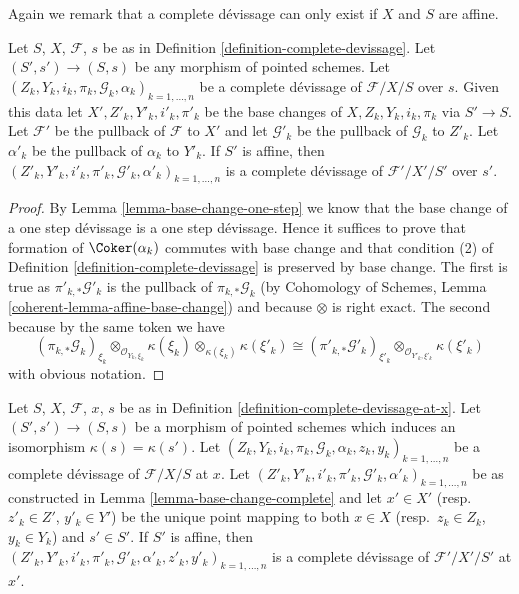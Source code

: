 \noindent
Again we remark that a complete d\'evissage can only exist if $X$ and
$S$ are affine.

\begin{lemma}
\label{lemma-base-change-complete}
Let $S$, $X$, $\mathcal{F}$, $s$ be as in
Definition \ref{definition-complete-devissage}.
Let $(S', s') \to (S, s)$ be any morphism of pointed schemes.
Let $(Z_k, Y_k, i_k, \pi_k, \mathcal{G}_k, \alpha_k)_{k = 1, \ldots, n}$
be a complete d\'evissage of $\mathcal{F}/X/S$ over $s$.
Given this data let $X', Z'_k, Y'_k, i'_k, \pi'_k$ be the base
changes of $X, Z_k, Y_k, i_k, \pi_k$ via $S' \to S$.
Let $\mathcal{F}'$ be the pullback of $\mathcal{F}$ to $X'$
and let $\mathcal{G}'_k$ be the pullback of $\mathcal{G}_k$ to $Z'_k$.
Let $\alpha'_k$ be the pullback of $\alpha_k$ to $Y'_k$.
If $S'$ is affine, then
$(Z'_k, Y'_k, i'_k, \pi'_k, \mathcal{G}'_k, \alpha'_k)_{k = 1, \ldots, n}$
is a complete d\'evissage of $\mathcal{F}'/X'/S'$ over $s'$.
\end{lemma}

\begin{proof}
By
Lemma \ref{lemma-base-change-one-step}
we know that the base change of a one step d\'evissage is a one step
d\'evissage. Hence it suffices to prove that formation of
$\Coker(\alpha_k)$ commutes with base change and that
condition (2) of
Definition \ref{definition-complete-devissage}
is preserved by base change. The first is true as
$\pi'_{k, *}\mathcal{G}'_k$ is the pullback of
$\pi_{k, *}\mathcal{G}_k$ (by
Cohomology of Schemes, Lemma \ref{coherent-lemma-affine-base-change})
and because $\otimes$ is right exact. The second because
by the same token we have
$$
(\pi_{k, *}\mathcal{G}_k)_{\xi_k}
\otimes_{\mathcal{O}_{Y_k, \xi_k}} \kappa(\xi_k)
\otimes_{\kappa(\xi_k)} \kappa(\xi'_k)
\cong
(\pi'_{k, *}\mathcal{G}'_k)_{\xi'_k}
\otimes_{\mathcal{O}_{Y'_k, \xi'_k}} \kappa(\xi'_k)
$$
with obvious notation.
\end{proof}

\begin{lemma}
\label{lemma-base-change-complete-at-x}
Let $S$, $X$, $\mathcal{F}$, $x$, $s$ be as in
Definition \ref{definition-complete-devissage-at-x}.
Let $(S', s') \to (S, s)$ be a morphism of pointed schemes
which induces an isomorphism $\kappa(s) = \kappa(s')$. Let
$(Z_k, Y_k, i_k, \pi_k, \mathcal{G}_k, \alpha_k, z_k, y_k)_{k = 1, \ldots, n}$
be a complete d\'evissage of $\mathcal{F}/X/S$ at $x$.
Let
$(Z'_k, Y'_k, i'_k, \pi'_k, \mathcal{G}'_k, \alpha'_k)_{k = 1, \ldots, n}$
be as constructed in
Lemma \ref{lemma-base-change-complete}
and let $x' \in X'$ (resp.\ $z'_k \in Z'$, $y'_k \in Y'$) be the
unique point mapping to both $x \in X$ (resp.\ $z_k \in Z_k$, $y_k \in Y_k$)
and $s' \in S'$.
If $S'$ is affine, then
$(Z'_k, Y'_k, i'_k, \pi'_k, \mathcal{G}'_k, \alpha'_k,
z'_k, y'_k)_{k = 1, \ldots, n}$
is a complete d\'evissage of $\mathcal{F}'/X'/S'$ at $x'$.
\end{lemma}

